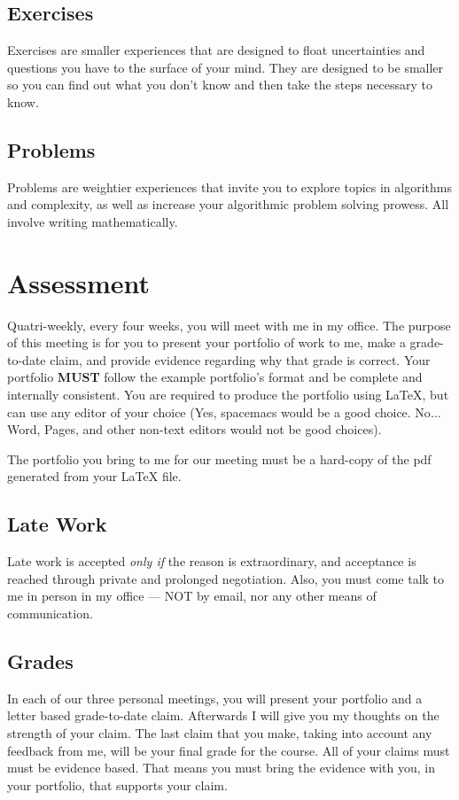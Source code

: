 \documentclass[12pt]{amsart}
\begin{document}
\subsection{Exercises} Exercises are smaller experiences that are designed to float uncertainties and questions you have to the surface of your mind. They are designed to be smaller so you can find out what you don't know and then take the steps necessary to know.
\subsection{Problems} Problems are weightier experiences that invite you to explore topics in algorithms and complexity, as well as increase your algorithmic problem solving prowess. All involve writing mathematically.

\section{Assessment} Quatri-weekly, every four weeks, you will meet with me in my office. The purpose of this meeting is for you to present your portfolio of work to me, make a grade-to-date claim, and provide evidence regarding why that grade is correct. Your portfolio \textbf{MUST} follow the example portfolio's format and be complete and internally consistent. You are required to produce the portfolio using \LaTeX, but can use any editor of your choice (Yes, spacemacs would be a good choice. No$\ldots$Word, Pages, and other non-text editors would not be good choices).

The portfolio you bring to me for our meeting must be a hard-copy of the pdf generated from your \LaTeX{} file.
\subsection{Late Work} Late work is accepted \textit{only if} the reason is extraordinary, and acceptance is reached through private and prolonged negotiation. Also, you must come talk to me in person in my office --- NOT by email, nor any other means of communication.
\subsection{Grades} In each of our three personal meetings, you will present your portfolio and a letter based grade-to-date claim. Afterwards I will give you my thoughts on the strength of your claim. The last claim that you make, taking into account any feedback from me, will be your final grade for the course. All of your claims must must be evidence based. That means you must bring the evidence with you, in your portfolio, that supports your claim. 
\end{document}
